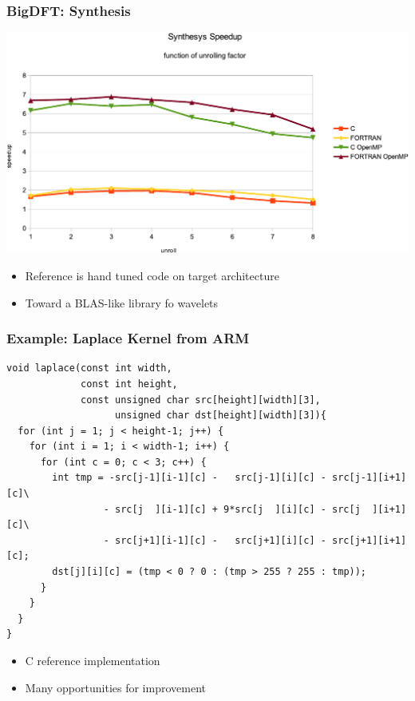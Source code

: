 \documentclass{beamer}
\begin{document}
\begin{frame}
  \frametitle{BigDFT: Synthesis}
  \begin{center}
    \includegraphics[scale=0.40]{Res_synthesis}
  \end{center}

  \begin{itemize}
    \item Reference is hand tuned code on target architecture
    \item Toward a BLAS-like library fo wavelets
  \end{itemize}
\end{frame}


\begin{frame}[fragile]
  \frametitle{Example: Laplace Kernel from ARM}
\tiny
\lstset{style=C}
\begin{lstlisting}
void laplace(const int width,
             const int height,
             const unsigned char src[height][width][3],
                   unsigned char dst[height][width][3]){
  for (int j = 1; j < height-1; j++) {
    for (int i = 1; i < width-1; i++) {
      for (int c = 0; c < 3; c++) {
        int tmp = -src[j-1][i-1][c] -   src[j-1][i][c] - src[j-1][i+1][c]\
                 - src[j  ][i-1][c] + 9*src[j  ][i][c] - src[j  ][i+1][c]\
                 - src[j+1][i-1][c] -   src[j+1][i][c] - src[j+1][i+1][c];
        dst[j][i][c] = (tmp < 0 ? 0 : (tmp > 255 ? 255 : tmp));
      }
    }
  }
}
\end{lstlisting}
\begin{itemize}
\item C reference implementation
\item Many opportunities for improvement
\end{itemize}
\end{frame}
\end{document}
